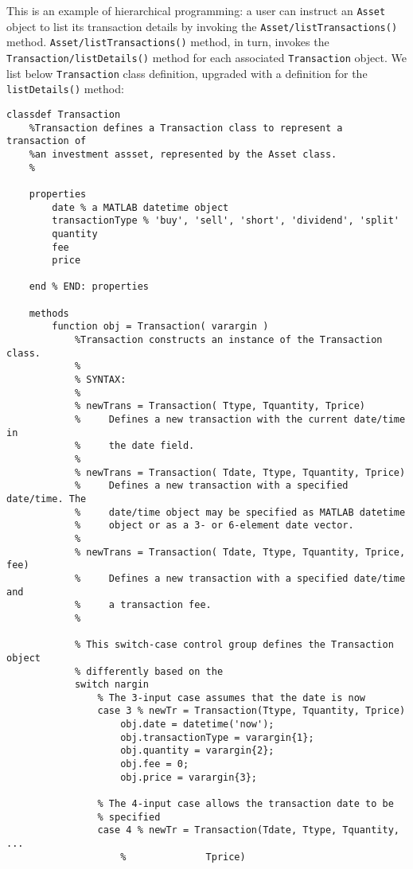This is an example of hierarchical programming: a user can instruct an \texttt{Asset} object to list its transaction details by invoking the \texttt{Asset/listTransactions()} method. \texttt{Asset/listTransactions()} method, in turn, invokes the \texttt{Transaction/listDetails()} method for each associated \texttt{Transaction} object. We list below \texttt{Transaction} class definition, upgraded with a definition for the \texttt{listDetails()} method:
\begin{lstlisting}[style=Matlab-editor]
classdef Transaction
    %Transaction defines a Transaction class to represent a transaction of
    %an investment assset, represented by the Asset class.
    %
    
    properties
        date % a MATLAB datetime object
        transactionType % 'buy', 'sell', 'short', 'dividend', 'split'
        quantity
        fee
        price
        
    end % END: properties
    
    methods
        function obj = Transaction( varargin )
            %Transaction constructs an instance of the Transaction class.
            %
            % SYNTAX:
            %
            % newTrans = Transaction( Ttype, Tquantity, Tprice)
            %     Defines a new transaction with the current date/time in
            %     the date field.
            %
            % newTrans = Transaction( Tdate, Ttype, Tquantity, Tprice)
            %     Defines a new transaction with a specified date/time. The
            %     date/time object may be specified as MATLAB datetime
            %     object or as a 3- or 6-element date vector.
            %
            % newTrans = Transaction( Tdate, Ttype, Tquantity, Tprice, fee)
            %     Defines a new transaction with a specified date/time and
            %     a transaction fee.
            %
            
            % This switch-case control group defines the Transaction object
            % differently based on the 
            switch nargin
                % The 3-input case assumes that the date is now
                case 3 % newTr = Transaction(Ttype, Tquantity, Tprice)
                    obj.date = datetime('now');
                    obj.transactionType = varargin{1};
                    obj.quantity = varargin{2};
                    obj.fee = 0;
                    obj.price = varargin{3};
                    
                % The 4-input case allows the transaction date to be
                % specified
                case 4 % newTr = Transaction(Tdate, Ttype, Tquantity, ...
                    %              Tprice)
                    

\end{lstlisting}
